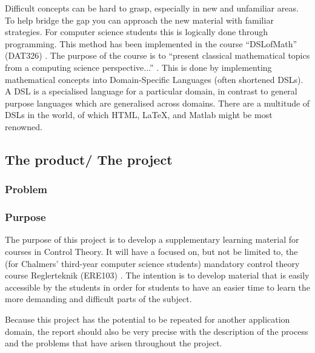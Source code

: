 Difficult concepts can be hard to grasp, especially in new and unfamiliar areas. To help bridge the gap you can approach the new material with familiar strategies. For computer science students this is logically done through programming. This method has been implemented in the course “\gls{DSLofMath}” (\gls{DAT326}) \cite{DAT326}. The purpose of the course is to ``present classical mathematical topics from a computing science perspective...'' \cite{DAT326}. This is done by implementing mathematical concepts into Domain-Specific Languages (often shortened \gls{DSL}s). A \gls{DSL} is a specialised language for a particular domain, in contrast to general purpose languages which are generalised across domains. There are a multitude of \gls{DSL}s in the world, of which HTML, \LaTeX, and Matlab \cite{mernik_heering_sloane_2005} might be most renowned.


\subsection{The product/ The project}


\subsubsection{Problem}





\subsubsection{Purpose}\label{sec:purpose} 
The purpose of this project is to develop a supplementary learning material for courses in Control Theory. It will have a focused on, but not be limited to, the (for Chalmers' third-year computer science students) mandatory control theory course Reglerteknik (ERE103) \cite{ERE103}.  The intention is to develop material that is easily accessible by the students in order for students to have an easier time to learn the more demanding and difficult parts of the subject. 

Because this project has the potential to be repeated for another application domain, the report should also be very precise with the description of the process and the problems that have arisen throughout the project.
\fi

\iffalse
Syfte
Specificerar vad rapporten är tänkt att resultera i och vilken typ av resultat som kommer att uppnås. 
Lämpligt att ha ett generellt syfte, kanske några få specificerade delsyften. 
I problemanalysen bryts syftet ner i mer detaljerade delsyften.
\fi